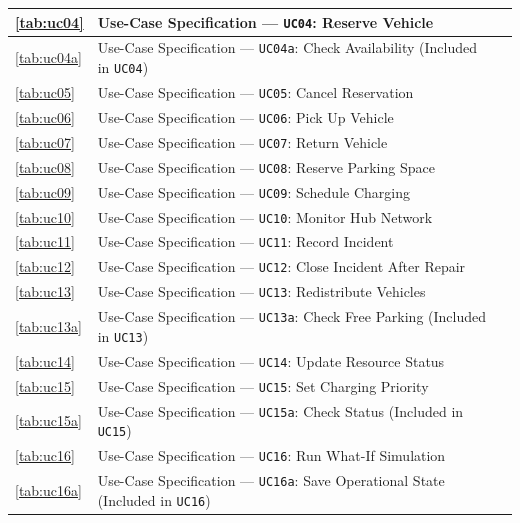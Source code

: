 \documentclass[oneside,final]{hcmut-report}
\begin{document}
{\begin{longtable}[l]{|C{1.5cm}|L{11.85cm}|C{1.32cm}|}
  \hline
  \ref{tab:uc04} & Use-Case Specification --- \texttt{UC04}: Reserve Vehicle & \pageref{tab:uc04} \\
  \hline
  \ref{tab:uc04a} & Use-Case Specification --- \texttt{UC04a}: Check Availability (Included in \texttt{UC04}) & \pageref{tab:uc04a} \\
  \hline
  \ref{tab:uc05} & Use-Case Specification --- \texttt{UC05}: Cancel Reservation & \pageref{tab:uc05} \\
  \hline
  \ref{tab:uc06} & Use-Case Specification --- \texttt{UC06}: Pick Up Vehicle & \pageref{tab:uc06} \\
  \hline
  \ref{tab:uc07} & Use-Case Specification --- \texttt{UC07}: Return Vehicle & \pageref{tab:uc07} \\
  \hline
  \ref{tab:uc08} & Use-Case Specification --- \texttt{UC08}: Reserve Parking Space & \pageref{tab:uc08} \\
  \hline
  \ref{tab:uc09} & Use-Case Specification --- \texttt{UC09}: Schedule Charging & \pageref{tab:uc09} \\
  \hline
  \ref{tab:uc10} & Use-Case Specification --- \texttt{UC10}: Monitor Hub Network & \pageref{tab:uc10} \\
  \hline
  \ref{tab:uc11} & Use-Case Specification --- \texttt{UC11}: Record Incident & \pageref{tab:uc11} \\
  \hline
  \ref{tab:uc12} & Use-Case Specification --- \texttt{UC12}: Close Incident After Repair & \pageref{tab:uc12} \\
  \hline
  \ref{tab:uc13} & Use-Case Specification --- \texttt{UC13}: Redistribute Vehicles & \pageref{tab:uc13} \\
  \hline
  \ref{tab:uc13a} & Use-Case Specification --- \texttt{UC13a}: Check Free Parking (Included in \texttt{UC13}) & \pageref{tab:uc13a} \\
  \hline
  \ref{tab:uc14} & Use-Case Specification --- \texttt{UC14}: Update Resource Status & \pageref{tab:uc14} \\
  \hline
  \ref{tab:uc15} & Use-Case Specification --- \texttt{UC15}: Set Charging Priority & \pageref{tab:uc15} \\
  \hline
  \ref{tab:uc15a} & Use-Case Specification --- \texttt{UC15a}: Check Status (Included in \texttt{UC15}) & \pageref{tab:uc15a} \\
  \hline
  \ref{tab:uc16} & Use-Case Specification --- \texttt{UC16}: Run What-If Simulation & \pageref{tab:uc16} \\
  \hline
  \ref{tab:uc16a} & Use-Case Specification --- \texttt{UC16a}: Save Operational State (Included in \texttt{UC16}) & \pageref{tab:uc16a} \\

\end{longtable}}
\end{document}

